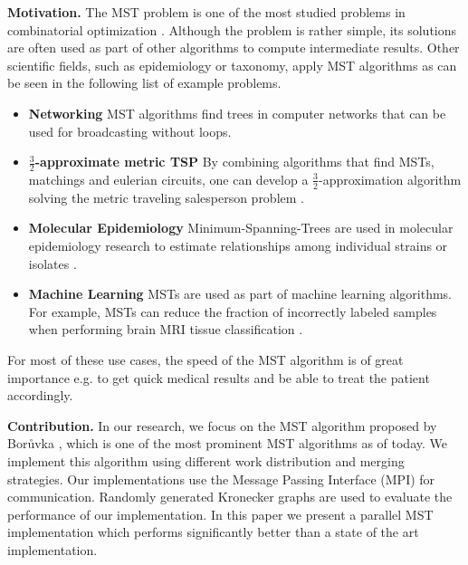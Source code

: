 \documentclass[letterpaper]{article}
\newcommand{\mypar}[1]{{\bf #1.}}
\begin{document}
\mypar{Motivation}
%
%
The MST problem is one of the most studied problems in combinatorial optimization \cite{graham1985history}. Although the
problem is rather simple, its solutions are often used as part of other algorithms to compute intermediate results.
Other scientific fields, such as epidemiology or taxonomy, apply MST algorithms as can be seen in the following list of
example problems.
\begin{itemize}
  \item \textbf{Networking} MST algorithms find trees in computer networks that can be used for broadcasting without
    loops. %
  \item \textbf{$\frac{3}{2}$-ap\-prox\-i\-mate metric TSP} By combining algorithms that find MSTs, matchings and
    eulerian circuits, one can develop a $\frac{3}{2}$-ap\-prox\-i\-mation algorithm solving the metric traveling
    salesperson problem \cite{christofides1976worst}.
  \item \textbf{Molecular Epidemiology} Minimum-Spanning-Trees are used in molecular epidemiology research to estimate
    relationships among individual strains or isolates \cite{spada2004use, salipante2011inadequacies}.
  \item \textbf{Machine Learning} MSTs are used as part of machine learning algorithms. For example, MSTs can reduce the
    fraction of incorrectly labeled samples when performing brain MRI tissue classification \cite{cocosco2003fully}.
\end{itemize}
For most of these use cases, the speed of the MST algorithm is of great importance e.g. to get quick medical results and
be able to treat the patient accordingly.

\mypar{Contribution}
In our research, we focus on the MST algorithm proposed by Bor\r{u}vka \cite{boruuvka1926jistem, nevsetvril2001otakar},
which is one of the most prominent MST algorithms as of today. We implement this algorithm using different work
distribution and merging strategies. Our implementations use the Message Passing Interface (MPI) for communication.
Randomly generated Kronecker graphs are used to evaluate the performance of our implementation. In this paper we present
a parallel MST implementation which performs significantly better than a state of the art implementation.
\end{document}
